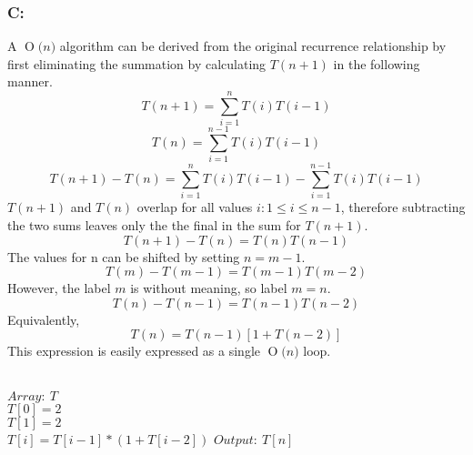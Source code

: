 \documentclass[12pt]{article}
\newcommand{\BigO}[1]{\ensuremath{\operatorname{O}\bigl(#1\bigr)}}
\begin{document}
\subsubsection*{C:}
A \BigO{n} algorithm can be derived from the original recurrence
relationship by first eliminating the summation by calculating
$T(n+1)$ in the following manner.
\[
T(n+1) = \sum_{i=1}^{n}T(i)T(i-1)
\]
\[
T(n) = \sum_{i=1}^{n-1}T(i)T(i-1)
\]
\[
T(n+1) - T(n) = \sum_{i=1}^{n}T(i)T(i-1) - \sum_{i=1}^{n-1}T(i)T(i-1)  
\]
$T(n+1)$ and $T(n)$ overlap for all values $i:1\leq i\leq n-1$, therefore
subtracting the two sums leaves only the the final in the sum for $T(n+1)$.
\[
T(n+1) - T(n) = T(n)T(n-1)
\] 
The values for n can be shifted by setting $n = m-1$.
\[
T(m) - T(m-1) = T(m-1)T(m-2)
\]
However, the label $m$ is without meaning, so label $m=n$.
\[
T(n) - T(n-1) = T(n-1)T(n-2)
\]
Equivalently,
\[
T(n) = T(n-1)[1+T(n-2)]
\]
\newpage
This expression is easily expressed as a single \BigO{n} loop.\\\\
\begin{algorithm}[H]
$Array:\ T$\\
$T[0] = 2$\\
$T[1] = 2$\\
{$T[i] = T[i-1]*(1+T[i-2])$}
$Output:\ T[n]$
\end{algorithm}
\end{document}
